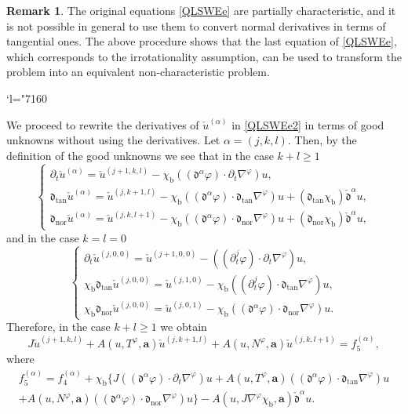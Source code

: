 \documentclass[JEP,XML,SOM,Unicode,NoFloatCountersInSection,published]{cedram}
\newcommand{\Changel}{\mathcode`l="7160}
\newcommand{\dtan}{{\mathfrak d}_\mathrm{tan}}
\newcommand{\dnor}{{\mathfrak d}_\mathrm{nor}}
\newcommand{\dt}{\partial_t}
\newcommand{\cmfalpha}{\check{\mathfrak{d}}^{\alpha}}
\theoremstyle{definition}
\newtheorem{remark}[theorem]{Remark}
\begin{document}
\begin{remark}
The original equations \eqref{QLSWEe} are partially characteristic,
and it is not possible in general to use them to convert normal derivatives in terms of tangential ones.
The above procedure shows that the last equation of \eqref{QLSWEe}, which corresponds to the irrotationality assumption,
can be used to transform the problem into an equivalent non-characteristic problem.
\end{remark}

\Changel

We proceed to rewrite the derivatives of $\check{u}^{(\alpha)}$ in \eqref{QLSWEe2} in terms of good unknowns without using the derivatives.
Let $\alpha=(j,k,l)$.
Then, by the definition of the good unknowns we see that in the case $k+l\geq1$
\begin{equation}\label{DGU1}
\begin{cases}
\dt\check{u}^{(\alpha)} = \check{u}^{(j+1,k,l)} - \chi_\mathrm{b}((\mathfrak{d}^\alpha\varphi)\cdot\dt\nabla^\varphi)u, \\
\dtan\check{u}^{(\alpha)} = \check{u}^{(j,k+1,l)} - \chi_\mathrm{b}((\mathfrak{d}^\alpha\varphi)\cdot\dtan\nabla^\varphi)u
+ (\dtan\chi_\mathrm{b}) \cmfalpha u, \\
\dnor\check{u}^{(\alpha)} = \check{u}^{(j,k,l+1)} - \chi_\mathrm{b}((\mathfrak{d}^\alpha\varphi)\cdot\dnor\nabla^\varphi)u
+ (\dnor\chi_\mathrm{b}) \cmfalpha u,
\end{cases}
\end{equation}
and in the case $k=l=0$
\begin{equation}\label{DGU2}
\begin{cases}
\dt\check{u}^{(j,0,0)} = \check{u}^{(j+1,0,0)} - ((\dt^j\varphi)\cdot\dt\nabla^\varphi)u, \\
\chi_\mathrm{b}\dtan\check{u}^{(j,0,0)} = \check{u}^{(j,1,0)} - \chi_\mathrm{b}((\dt^j\varphi)\cdot\dtan\nabla^\varphi)u, \\
\chi_\mathrm{b}\dnor\check{u}^{(j,0,0)} = \check{u}^{(j,0,1)} - \chi_\mathrm{b}((\mathfrak{d}^\alpha\varphi)\cdot\dnor\nabla^\varphi)u.
\end{cases}
\end{equation}
Therefore, in the case $k+l\geq1$ we obtain
\begin{equation}\label{QLSWEe3}
J\check{u}^{(j+1,k,l)}+A(u,T^\varphi,\bm{a})\check{u}^{(j,k+1,l)}+A(u,N^\varphi,\bm{a})\check{u}^{(j,k,l+1)}=f_5^{(\alpha)},
\end{equation}
where
\begin{multline*}
f_5^{(\alpha)}
= f_4^{(\alpha)} + \chi_\mathrm{b} \{ J((\mathfrak{d}^\alpha\varphi)\cdot\dt\nabla^\varphi)u
+ A(u,T^\varphi,\bm{a})((\mathfrak{d}^\alpha\varphi)\cdot\dtan\nabla^\varphi)u \\
+ A(u,N^\varphi,\bm{a})((\mathfrak{d}^\alpha\varphi)\cdot\dnor\nabla^\varphi)u \}
- A(u,J\nabla^\varphi\chi_\mathrm{b},\bm{a}) \cmfalpha u.
\end{multline*}
\end{document}

